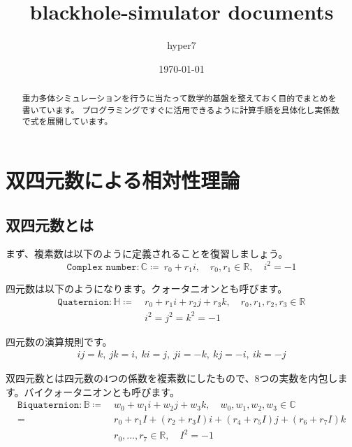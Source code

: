 \documentclass[a4paper,12pt,notitlepage]{jsreport}
\title{blackhole-simulator documents}
\author{hyper7}
\date{\today}
\begin{document}
\maketitle

\begin{abstract}
重力多体シミュレーションを行うに当たって数学的基盤を整えておく目的でまとめを書いています。
プログラミングですぐに活用できるように計算手順を具体化し実係数で式を展開しています。
\end{abstract}

\chapter{双四元数による相対性理論}

\section{双四元数とは}

まず、複素数は以下のように定義されることを復習しましょう。
\begin{equation}
\texttt{Complex number}:\mathbb{C}\coloneq ~r_0+r_1i,\quad r_0,r_1\in\mathbb{R},\quad i^2=-1
\end{equation}

四元数は以下のようになります。クォータニオンとも呼びます。
\begin{equation}
\begin{split}
\texttt{Quaternion}:\mathbb{H}\coloneq ~&r_0+r_1i+r_2j+r_3k,\quad r_0,r_1,r_2,r_3\in\mathbb{R}\\
&i^2=j^2=k^2=-1
\end{split}
\end{equation}

四元数の演算規則です。
\begin{gather}
ij=k,~jk=i,~ki=j,~ji=-k,~kj=-i,~ik=-j
\end{gather}

双四元数とは四元数の4つの係数を複素数にしたもので、8つの実数を内包します。バイクォータニオンとも呼びます。
\begin{equation}
\begin{split}
\texttt{Biquaternion}:\mathbb{B}\coloneq ~&w_0+w_1i+w_2j+w_3k,\quad w_0,w_1,w_2,w_3\in\mathbb{C}\\
=~&r_0+r_1I+(r_2+r_3I)i+(r_4+r_5I)j+(r_6+r_7I)k\\
&r_0,...,r_7\in\mathbb{R},\quad I^2=-1
\end{split}
\end{equation}
\end{document}
